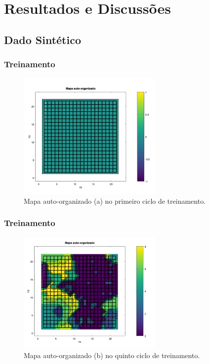 \documentclass[aspectratio=10]{beamer} %
\begin{document}

\section{Resultados e Discussões}

\subsection{Dado Sintético}

\begin{frame}
\frametitle{Treinamento}
\begin{figure}
\centering
\includegraphics[width=7.0cm]{Imagens/SOM1_2d.pdf}
\caption{Mapa auto-organizado (a) no primeiro ciclo de treinamento.}
\end{figure}
\end{frame}

\begin{frame}
\frametitle{Treinamento}
\begin{figure}
\centering
\includegraphics[width=7.0cm]{Imagens/SOM5_2d.pdf}
\caption{Mapa auto-organizado (b) no quinto ciclo de treinamento.}
\end{figure}
\end{frame}
\end{document}
